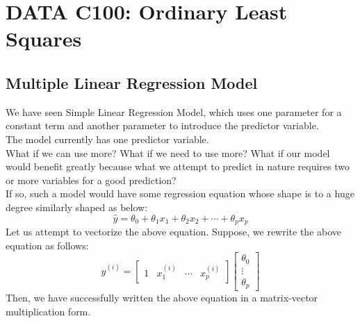 \chapter{DATA C100: Ordinary Least Squares}

\section{Multiple Linear Regression Model}
We have seen Simple Linear Regression Model, which uses one parameter for a constant term and another parameter to introduce the predictor variable. \\
The model currently has one predictor variable. \\
What if we can use more? What if we need to use more? What if our model would benefit greatly because what we attempt to predict in nature requires two or more variables for a good prediction? \\
If so, such a model would have some regression equation whose shape is to a huge degree similarly shaped as below:
\[\hat{y} = \theta_0 + \theta_1 x_1 + \theta_2 x_2 + \cdots + \theta_p x_p\]
Let us attempt to vectorize the above equation. Suppose, we rewrite the above equation as follows:
\[
    \hat{y}^{(i)} = 
    \begin{bmatrix} 1 & x_1^{(i)} & \cdots & x_p^{(i)} \end{bmatrix}
    \begin{bmatrix} \theta_0 \\ \vdots \\ \theta_p \end{bmatrix}
\]
Then, we have successfully written the above equation in a matrix-vector multiplication form. \\

